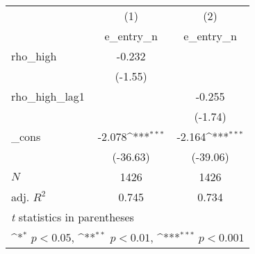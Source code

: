 {
\def\sym#1{\ifmmode^{#1}\else\(^{#1}\)\fi}
\begin{tabular}{l*{2}{c}}
\toprule
            &\multicolumn{1}{c}{(1)}&\multicolumn{1}{c}{(2)}\\
            &\multicolumn{1}{c}{e\_entry\_n}&\multicolumn{1}{c}{e\_entry\_n}\\
\midrule
rho\_high    &      -0.232         &                     \\
            &     (-1.55)         &                     \\
\addlinespace
rho\_high\_lag1&                     &      -0.255         \\
            &                     &     (-1.74)         \\
\addlinespace
\_cons      &      -2.078\sym{***}&      -2.164\sym{***}\\
            &    (-36.63)         &    (-39.06)         \\
\midrule
\(N\)       &        1426         &        1426         \\
adj. \(R^{2}\)&       0.745         &       0.734         \\
\bottomrule
\multicolumn{3}{l}{\footnotesize \textit{t} statistics in parentheses}\\
\multicolumn{3}{l}{\footnotesize \sym{*} \(p<0.05\), \sym{**} \(p<0.01\), \sym{***} \(p<0.001\)}\\
\end{tabular}
}
